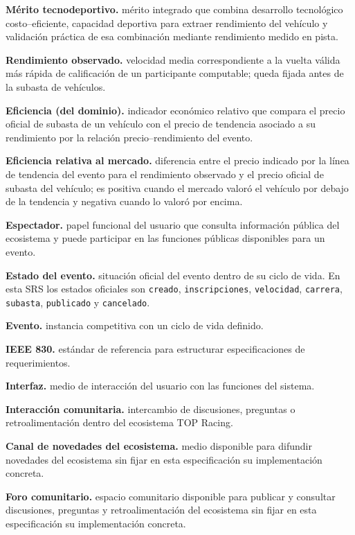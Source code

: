 \documentclass[10pt,letterpaper]{article}
\begin{document}
\noindent\textbf{Mérito tecnodeportivo.} mérito integrado que combina desarrollo tecnológico costo--eficiente, capacidad deportiva para extraer rendimiento del vehículo y validación práctica de esa combinación mediante rendimiento medido en pista.\par
\noindent\textbf{Rendimiento observado.} velocidad media correspondiente a la vuelta válida más rápida de calificación de un participante computable; queda fijada antes de la subasta de vehículos.\par
\noindent\textbf{Eficiencia (del dominio).} indicador económico relativo que compara el precio oficial de subasta de un vehículo con el precio de tendencia asociado a su rendimiento por la relación precio--rendimiento del evento.\par
\noindent\textbf{Eficiencia relativa al mercado.} diferencia entre el precio indicado por la línea de tendencia del evento para el rendimiento observado y el precio oficial de subasta del vehículo; es positiva cuando el mercado valoró el vehículo por debajo de la tendencia y negativa cuando lo valoró por encima.\par
\noindent\textbf{Espectador.} papel funcional del usuario que consulta información pública del ecosistema y puede participar en las funciones públicas disponibles para un evento.\par
\noindent\textbf{Estado del evento.} situación oficial del evento dentro de su ciclo de vida. En esta SRS los estados oficiales son \texttt{creado}, \texttt{inscripciones}, \texttt{velocidad}, \texttt{carrera}, \texttt{subasta}, \texttt{publicado} y \texttt{cancelado}.\par
\noindent\textbf{Evento.} instancia competitiva con un ciclo de vida definido.\par
\noindent\textbf{IEEE 830.} estándar de referencia para estructurar especificaciones de requerimientos.\par
\noindent\textbf{Interfaz.} medio de interacción del usuario con las funciones del sistema.\par
\noindent\textbf{Interacción comunitaria.} intercambio de discusiones, preguntas o retroalimentación dentro del ecosistema TOP Racing.\par
\noindent\textbf{Canal de novedades del ecosistema.} medio disponible para difundir novedades del ecosistema sin fijar en esta especificación su implementación concreta.\par
\noindent\textbf{Foro comunitario.} espacio comunitario disponible para publicar y consultar discusiones, preguntas y retroalimentación del ecosistema sin fijar en esta especificación su implementación concreta.\par
\end{document}
